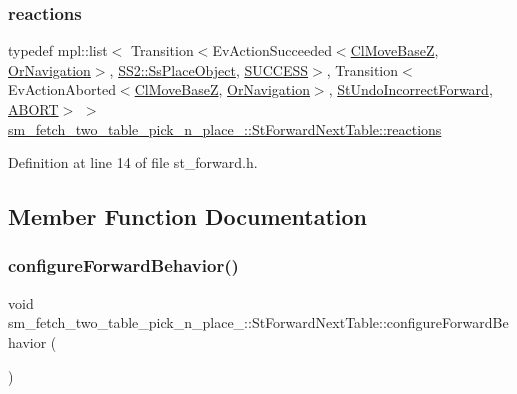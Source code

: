 \subsubsection{\texorpdfstring{reactions}{reactions}}
{\footnotesize\ttfamily typedef mpl\+::list$<$ Transition$<$Ev\+Action\+Succeeded$<$\hyperlink{classcl__move__base__z_1_1ClMoveBaseZ}{Cl\+Move\+BaseZ}, \hyperlink{classsm__fetch__two__table__pick__n__place__1_1_1OrNavigation}{Or\+Navigation}$>$, \hyperlink{structsm__fetch__two__table__pick__n__place__1_1_1SS2_1_1SsPlaceObject}{S\+S2\+::\+Ss\+Place\+Object}, \hyperlink{classSUCCESS}{S\+U\+C\+C\+E\+SS}$>$, Transition$<$Ev\+Action\+Aborted$<$\hyperlink{classcl__move__base__z_1_1ClMoveBaseZ}{Cl\+Move\+BaseZ}, \hyperlink{classsm__fetch__two__table__pick__n__place__1_1_1OrNavigation}{Or\+Navigation}$>$, \hyperlink{structsm__fetch__two__table__pick__n__place__1_1_1StUndoIncorrectForward}{St\+Undo\+Incorrect\+Forward}, \hyperlink{classABORT}{A\+B\+O\+RT}$>$ $>$ \hyperlink{structsm__fetch__two__table__pick__n__place__1_1_1StForwardNextTable_a3f9140610169847ec279db29780746d8}{sm\+\_\+fetch\+\_\+two\+\_\+table\+\_\+pick\+\_\+n\+\_\+place\+\_\+::\+St\+Forward\+Next\+Table\+::reactions}}



Definition at line 14 of file st\+\_\+forward.\+h.



\subsection{Member Function Documentation}
\mbox{\label{structsm__fetch__two__table__pick__n__place__1_1_1StForwardNextTable_ae2358c473474c13a9cf8c017ec7e7735}} 
\subsubsection{\texorpdfstring{configure\+Forward\+Behavior()}{configureForwardBehavior()}}
{\footnotesize\ttfamily void sm\+\_\+fetch\+\_\+two\+\_\+table\+\_\+pick\+\_\+n\+\_\+place\+\_\+::\+St\+Forward\+Next\+Table\+::configure\+Forward\+Behavior (\begin{DoxyParamCaption}{ }\end{DoxyParamCaption})\hspace{0.3cm}{\ttfamily [inline]}}



